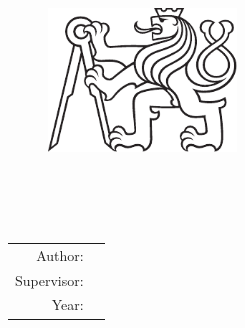
\begin{center}
	\pagestyle{empty}
	{\LARGE \textsc \CVUT}\\[2ex]
	{\LARGE \textsc \FS}\\[4ex]
	{\Large \textsc \USTAV}\\

	\vspace{2cm}
	\begin{figure}[h]
	\begin{center}
	  {\includegraphics[width=5cm]{Figures/Logo/symbol_cvut_konturova_verze_cb.pdf}}
	\end{center}
	\end{figure}
	\vspace{1cm}

	{\textbf {\Huge \ThesisType \\[6ex]}}
	{\LARGE \bf \ThesisTitle}\\[6ex]
	{\LARGE \ThesisTitleCZ}\\

	\vfill

	{\large
	\begin{tabular}{rl}
		Author: & \ThesisAuthor\\
		Supervisor: & \ThesisSupervisor\\
		Year: & \ThesisYear
	\end{tabular}
	}

	\newpage
\end{center}